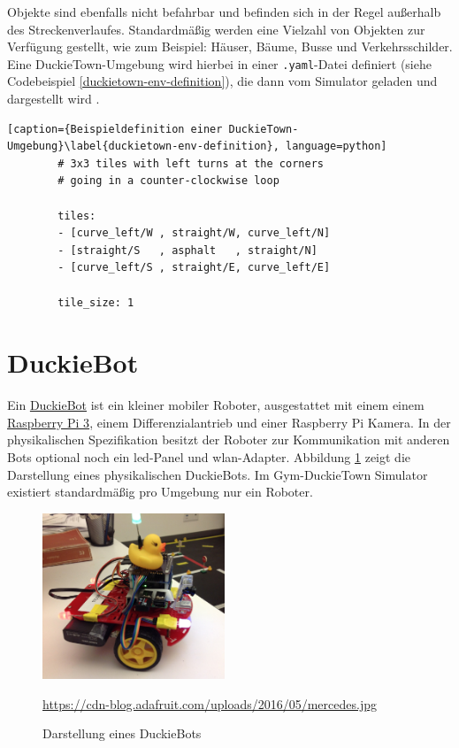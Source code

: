 Objekte sind ebenfalls nicht befahrbar und befinden sich in der Regel außerhalb des Streckenverlaufes. Standardmäßig werden eine Vielzahl von Objekten zur Verfügung gestellt, wie zum Beispiel: Häuser, Bäume, Busse und Verkehrsschilder. \\

Eine DuckieTown-Umgebung wird hierbei in einer \texttt{.yaml}-Datei definiert (siehe Codebeispiel \ref{duckietown-env-definition}), die dann vom Simulator geladen und dargestellt wird .

\hspace{1cm}
\begin{minipage}{.73\linewidth}
	\begin{lstlisting}[caption={Beispieldefinition einer DuckieTown-Umgebung}\label{duckietown-env-definition}, language=python]
		# 3x3 tiles with left turns at the corners
		# going in a counter-clockwise loop
	
		tiles:
		- [curve_left/W , straight/W, curve_left/N]
		- [straight/S   , asphalt   , straight/N]
		- [curve_left/S , straight/E, curve_left/E]
	
		tile_size: 1
	\end{lstlisting}
\end{minipage}

\section{DuckieBot}
\label{duckiebot}

Ein \href{https://get.duckietown.com/products/duckiebot-db18}{DuckieBot} ist ein kleiner mobiler Roboter, ausgestattet mit einem einem \href{https://www.raspberrypi.org/}{Raspberry Pi 3}, einem Differenzialantrieb und einer Raspberry Pi Kamera.
In der physikalischen Spezifikation besitzt der Roboter zur Kommunikation mit anderen Bots optional noch ein \acs{led}-Panel und \acs{wlan}-Adapter. Abbildung \ref{fig:duckiebot} zeigt die Darstellung eines physikalischen DuckieBots. Im Gym-DuckieTown Simulator existiert standardmäßig pro Umgebung nur ein Roboter.

\begin{figure}[H]
	\centering
	\includegraphics[width=0.485\textwidth]{kapitel2/images/duckiebot.jpg}
	\caption{Darstellung eines DuckieBots}
	\label{fig:duckiebot}
	\vspace{0.2cm}
	\quelle\url{https://cdn-blog.adafruit.com/uploads/2016/05/mercedes.jpg}
\end{figure}


